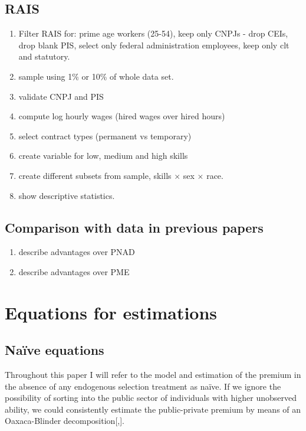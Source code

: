 \documentclass{article}
\begin{document}
\subsection{RAIS}
\begin{enumerate}
    \item Filter RAIS for: prime age workers (25-54), keep only CNPJs - drop CEIs, drop blank PIS, select only federal administration employees, keep only clt and statutory.
    \item sample using 1\% or 10\% of whole data set.  
    \item validate CNPJ and PIS
    \item compute log hourly wages (hired wages over hired hours)
    \item select contract types (permanent vs temporary)
    \item create variable for low, medium and high skills
    \item create different subsets from sample, skills $\times$ sex $\times$ race.
    \item show descriptive statistics.
\end{enumerate}

\subsection{Comparison with data in previous papers}
\begin{enumerate}
    \item describe advantages over PNAD
    \item describe advantages over PME
\end{enumerate}

\section{Equations for estimations}
\subsection{Naïve equations}
Throughout this paper I will refer to the model and estimation of the premium in the absence of any endogenous selection treatment as naïve. If we ignore the possibility of sorting into the public sector of individuals with higher unobserved ability, we could consistently estimate the public-private premium by means of an Oaxaca-Blinder decomposition[\cite{oaxaca_male-female_1973},\cite{blinder_wage_1973}]. \\
\end{document}
